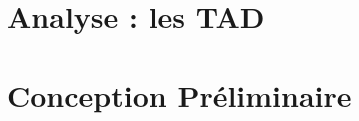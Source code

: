 \documentclass[10pt]{article}
\begin{document}
    \section{Analyse : les TAD}
        
        
        
        
        
        
    \section{Conception Préliminaire}
        
        
        
        
\end{document}
